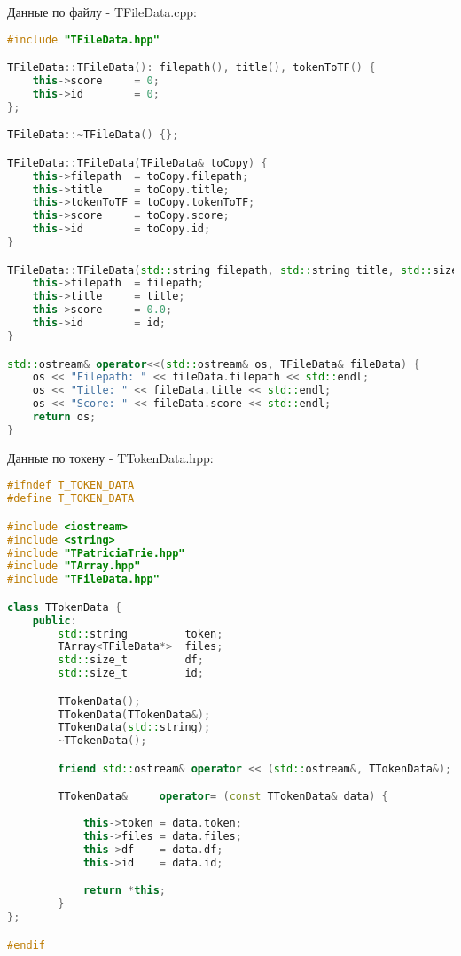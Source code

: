 Данные по файлу - TFileData.cpp:
\begin{lstlisting}[language=C++]
#include "TFileData.hpp"

TFileData::TFileData(): filepath(), title(), tokenToTF() {
    this->score     = 0;
    this->id        = 0;
};

TFileData::~TFileData() {};

TFileData::TFileData(TFileData& toCopy) {
    this->filepath  = toCopy.filepath;
    this->title     = toCopy.title;
    this->tokenToTF = toCopy.tokenToTF;
    this->score     = toCopy.score;
    this->id        = toCopy.id;
}

TFileData::TFileData(std::string filepath, std::string title, std::size_t id): tokenToTF() {
    this->filepath  = filepath;
    this->title     = title;
    this->score     = 0.0;
    this->id        = id;
}

std::ostream& operator<<(std::ostream& os, TFileData& fileData) {
    os << "Filepath: " << fileData.filepath << std::endl;
    os << "Title: " << fileData.title << std::endl;
    os << "Score: " << fileData.score << std::endl;
    return os;
}
\end{lstlisting}

Данные по токену - TTokenData.hpp:
\begin{lstlisting}[language=C++]
#ifndef T_TOKEN_DATA
#define T_TOKEN_DATA

#include <iostream>
#include <string>
#include "TPatriciaTrie.hpp"
#include "TArray.hpp"
#include "TFileData.hpp"

class TTokenData {
    public:
        std::string         token;
        TArray<TFileData*>  files;
        std::size_t         df;
        std::size_t         id;

        TTokenData();
        TTokenData(TTokenData&);
        TTokenData(std::string);
        ~TTokenData();

        friend std::ostream& operator << (std::ostream&, TTokenData&);

        TTokenData&     operator= (const TTokenData& data) {
            
            this->token = data.token;
            this->files = data.files;
            this->df    = data.df;
            this->id    = data.id;

            return *this;
        }
};

#endif
\end{lstlisting}


